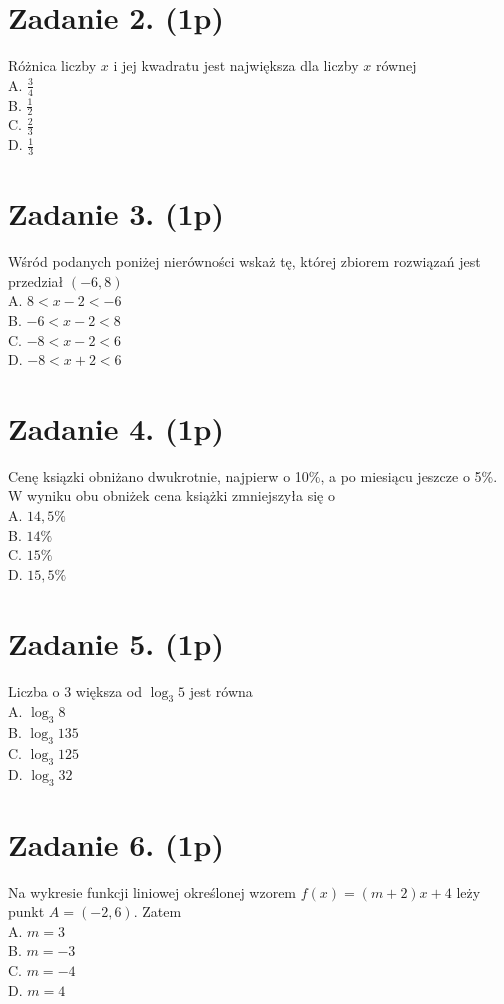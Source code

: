 \documentclass[10pt]{article}
\begin{document}
\section*{Zadanie 2. (1p)}
Różnica liczby \(x\) i jej kwadratu jest największa dla liczby \(x\) równej\\
A. \(\frac{3}{4}\)\\
B. \(\frac{1}{2}\)\\
C. \(\frac{2}{3}\)\\
D. \(\frac{1}{3}\)

\section*{Zadanie 3. (1p)}
Wśród podanych poniżej nierówności wskaż tę, której zbiorem rozwiązań jest przedział \((-6,8)\)\\
A. \(8<x-2<-6\)\\
B. \(-6<x-2<8\)\\
C. \(-8<x-2<6\)\\
D. \(-8<x+2<6\)

\section*{Zadanie 4. (1p)}
Cenę ksiązki obniżano dwukrotnie, najpierw o 10\%, a po miesiącu jeszcze o 5\%. W wyniku obu obniżek cena książki zmniejszyła się o\\
A. \(14,5 \%\)\\
B. \(14 \%\)\\
C. \(15 \%\)\\
D. \(15,5 \%\)

\section*{Zadanie 5. (1p)}
Liczba o 3 większa od \(\log _{3} 5\) jest równa\\
A. \(\log _{3} 8\)\\
B. \(\log _{3} 135\)\\
C. \(\log _{3} 125\)\\
D. \(\log _{3} 32\)

\section*{Zadanie 6. (1p)}
Na wykresie funkcji liniowej określonej wzorem \(f(x)=(m+2) x+4\) leży punkt \(A=(-2,6)\). Zatem\\
A. \(m=3\)\\
B. \(m=-3\)\\
C. \(m=-4\)\\
D. \(m=4\)
\end{document}
